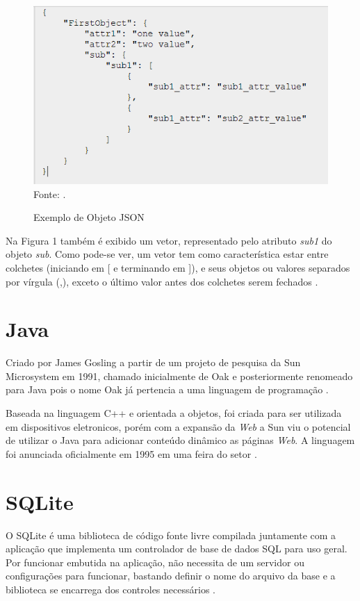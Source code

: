 \begin{figure}[!htb]
     \centering
     \caption{Exemplo de Objeto JSON}
     \includegraphics[scale=1]{imagens/exemplojson.png}
     \\ Fonte: \cite{JSONLint}.
\end{figure}

Na Figura 1 também é exibido um vetor, representado pelo atributo \emph{sub1} do objeto \emph{sub}. Como pode-se ver, um vetor tem como característica estar entre colchetes (iniciando em [ e terminando em ]), e seus objetos ou valores separados por vírgula (,), exceto o último valor antes dos colchetes serem fechados \cite{JSON}.

\section{Java}

Criado por James Gosling a partir de um projeto de pesquisa da Sun Microsystem em 1991, chamado inicialmente de Oak e posteriormente renomeado para Java pois o nome Oak já pertencia a uma linguagem de programação \cite{java_deitel}.

Baseada na linguagem C++ e orientada a objetos, foi criada para ser utilizada em dispositivos eletronicos, porém com a expansão da \emph{Web} a Sun viu o potencial de utilizar o Java para adicionar conteúdo dinâmico as páginas \emph{Web}. A linguagem foi anunciada oficialmente em 1995 em uma feira do setor \cite{java_deitel}.

\section{SQLite}
O SQLite é uma biblioteca de código fonte livre compilada juntamente com a aplicação que implementa um controlador de base de dados SQL para uso geral. Por funcionar embutida na aplicação, não necessita de um servidor ou configurações para funcionar, bastando definir o nome do arquivo da base e a biblioteca se encarrega dos controles necessários \cite{SQLite}.


